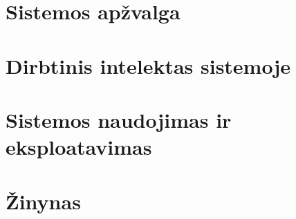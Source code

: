 \documentclass[a4paper, fontsize=10.5pt, DIV=calc, parskip=half-, oneside, open=any,
               numbers=noenddot, headings=normal, toc=chapterentrydotfill,
               listof=totoc, bibliography=totoc]{scrreprt}
\newif\ifwhole \wholetrue
\newcommand{\docpart}[1]{\ifwhole\part{#1}\fi}
\begin{document}
\ifwhole
  
  
  \tableofcontents
\fi


\docpart{Sistemos apžvalga}





\docpart{Dirbtinis intelektas sistemoje}












\docpart{Sistemos naudojimas ir eksploatavimas}








\appendix
\docpart{Žinynas}





\end{document}

